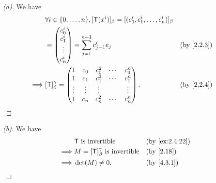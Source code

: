 \begin{proof}[(a)]
  We have
  \begin{align*}
             & \forall i \in \set{0, \dots, n}, [\T(x^i)]_{\beta} = [(c_0^i, c_1^i, \dots, c_n^i)]_{\beta}                                 \\
             & = \begin{pmatrix}
                   c_0^i  \\
                   c_1^i  \\
                   \vdots \\
                   c_n^i
                 \end{pmatrix} = \sum_{j = 1}^{n + 1} c_{j - 1}^i e_j                                        &  & \text{(by \cref{2.2.3})} \\
    \implies & [\T]_{\beta}^{\gamma} = \begin{pmatrix}
                                         1      & c_0    & c_0^2  & \cdots & c_0^n  \\
                                         1      & c_1    & c_1^2  & \cdots & c_1^n  \\
                                         \vdots & \vdots & \vdots &        & \vdots \\
                                         1      & c_n    & c_n^2  & \cdots & c_n^n
                                       \end{pmatrix}.                                               &  & \text{(by \cref{2.2.4})}
  \end{align*}
\end{proof}

\begin{proof}[(b)]
  We have
  \begin{align*}
             & \T \text{ is invertible}                        &  & \text{(by \cref{ex:2.4.22})} \\
    \implies & M = [\T]_{\beta}^{\gamma} \text{ is invertible} &  & \text{(by \cref{2.18})}      \\
    \implies & \det(M) \neq 0.                                 &  & \text{(by \cref{4.3.1})}
  \end{align*}
\end{proof}


